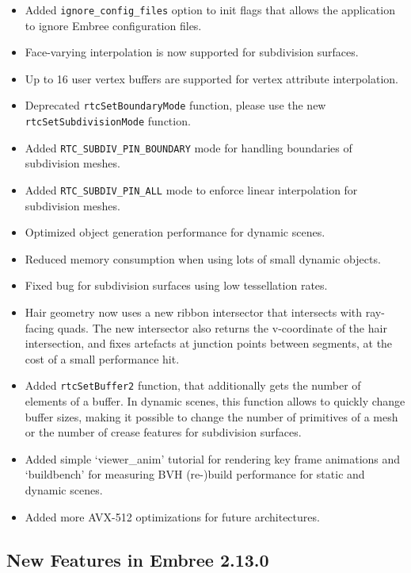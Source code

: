 \begin{itemize}
\tightlist
\item
  Added \texttt{ignore\_config\_files} option to init flags that allows
  the application to ignore Embree configuration files.
\item
  Face-varying interpolation is now supported for subdivision surfaces.
\item
  Up to 16 user vertex buffers are supported for vertex attribute
  interpolation.
\item
  Deprecated \texttt{rtcSetBoundaryMode} function, please use the new
  \texttt{rtcSetSubdivisionMode} function.
\item
  Added \texttt{RTC\_SUBDIV\_PIN\_BOUNDARY} mode for handling boundaries
  of subdivision meshes.
\item
  Added \texttt{RTC\_SUBDIV\_PIN\_ALL} mode to enforce linear
  interpolation for subdivision meshes.
\item
  Optimized object generation performance for dynamic scenes.
\item
  Reduced memory consumption when using lots of small dynamic objects.
\item
  Fixed bug for subdivision surfaces using low tessellation rates.
\item
  Hair geometry now uses a new ribbon intersector that intersects with
  ray-facing quads. The new intersector also returns the v-coordinate of
  the hair intersection, and fixes artefacts at junction points between
  segments, at the cost of a small performance hit.
\item
  Added \texttt{rtcSetBuffer2} function, that additionally gets the
  number of elements of a buffer. In dynamic scenes, this function
  allows to quickly change buffer sizes, making it possible to change
  the number of primitives of a mesh or the number of crease features
  for subdivision surfaces.
\item
  Added simple `viewer\_anim' tutorial for rendering key frame
  animations and `buildbench' for measuring BVH (re-)build performance
  for static and dynamic scenes.
\item
  Added more AVX-512 optimizations for future architectures.
\end{itemize}

\subsection{New Features in Embree
2.13.0}\label{new-features-in-embree-2.13.0}

